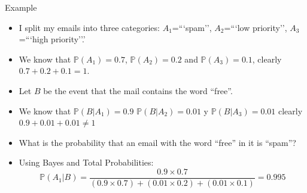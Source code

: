 \documentclass[handout]{beamer}
\begin{document}
\begin{frame}{Example}
\scriptsize{
\begin{itemize}
 \item I split my emails into three categories: $A_1$=```spam'', $A_2$=```low priority'', $A_3$=```high priority''.'
 \item We know that $\mathbb{P}(A_1)=0.7$, $\mathbb{P}(A_2)=0.2$ and $\mathbb{P}(A_3)=0.1$, clearly $0.7+0.2+0.1=1$.
 \item Let $B$ be the event that the mail contains the word ``free''.
 \item We know that $\mathbb{P}(B|A_1)=0.9$ $\mathbb{P}(B|A_2)=0.01$ y $\mathbb{P}(B|A_3)=0.01$ clearly $0.9+0.01+0.01 \neq 1$
 \item  What is the probability that an email with the word ``free'' in it is ``spam''?
 \item Using Bayes and Total Probabilities:
 \begin{displaymath}
  \mathbb{P}(A_1|B) = \frac{0.9 \times 0.7}{(0.9 \times 0.7) + (0.01 \times 0.2) + (0.01 \times 0.1)} = 0.995
 \end{displaymath}



\end{itemize}




} 
\end{frame}
\end{document}
